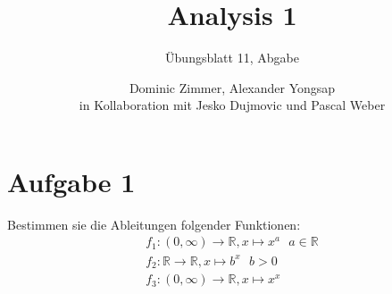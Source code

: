 \documentclass{scrreprt}
\newcommand{\RR}{\mathbb{R}}
\newcommand{\round}[1]{\left(#1\right)}
\newcommand{\round}[1]{\left\(#1\right\)}
\begin{document}
	\title{Analysis 1}
 	\author{Dominic Zimmer, Alexander Yongsap\\in Kollaboration mit Jesko Dujmovic und Pascal Weber}
 	\subtitle{Übungsblatt 11, Abgabe}
 	\publishers{Übungsgruppe: Rami Ahmad}
  	\maketitle 


\section*{Aufgabe 1}
Bestimmen sie die Ableitungen folgender Funktionen:
\begin{align*}
    f_1 \colon \round{0,\infty} \to \RR, x \mapsto x^a ~~~ a \in \RR\\
    f_2 \colon \RR \to \RR, x \mapsto b^x~~~ b >0\\
    f_3 \colon \round{0,\infty} \to \RR, x \mapsto x^x
\end{align*}
\end{document}
